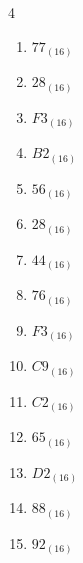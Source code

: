 \begin{multicols}{4}
\begin{enumerate}
  \item $77_{(16)}$

        \phantom{$=119$}

  \item $28_{(16)}$

        \phantom{$=40$}

  \item $F3_{(16)}$

        \phantom{$=243$}

  \item $B2_{(16)}$

        \phantom{$=178$}

  \item $56_{(16)}$

        \phantom{$=86$}

  \item $28_{(16)}$

        \phantom{$=40$}

\columnbreak %

\resetques

  \item $44_{(16)}$

        \phantom{$=68$}

  \item $76_{(16)}$

        \phantom{$=118$}

  \item $F3_{(16)}$

        \phantom{$=243$}

  \item $C9_{(16)}$

        \phantom{$=201$}

  \item $C2_{(16)}$

        \phantom{$=194$}

  \item $65_{(16)}$

        \phantom{$=101$}

  \item $D2_{(16)}$

        \phantom{$=210$}

  \item $88_{(16)}$

        \phantom{$=136$}

  \item $92_{(16)}$

        \phantom{$=146$}


\end{enumerate}
\end{multicols}
